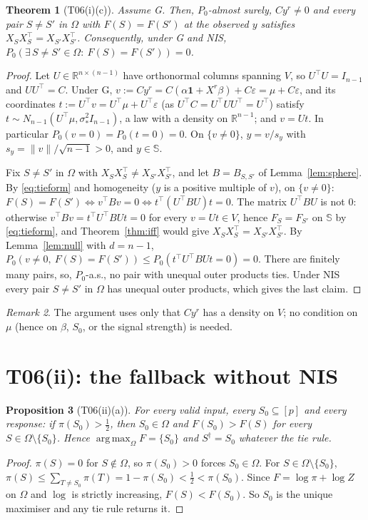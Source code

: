 \documentclass[11pt]{article}
\newtheorem{theorem}{Theorem}[section]
\newtheorem{proposition}[theorem]{Proposition}
\theoremstyle{remark}
\newtheorem{remark}[theorem]{Remark}
\newcommand{\R}{\mathbb R}
\newcommand{\Sph}{\mathbb S}
\newcommand{\one}{\mathbf 1}
\DeclareMathOperator*{\argmax}{arg\,max}
\begin{document}
\begin{theorem}[T06(i)(c)]\label{thm:as}
Assume G. Then, $P_0$-almost surely, $Cy^r\ne0$ and every pair $S\ne S'$ in $\Omega$ with $F(S)=F(S')$ at the observed $y$ satisfies $X_SX_S^\top=X_{S'}X_{S'}^\top$. Consequently, under G and NIS, $P_0(\exists\,S\ne S'\in\Omega:\ F(S)=F(S'))=0$.
\end{theorem}
\begin{proof}
Let $U\in\R^{n\times(n-1)}$ have orthonormal columns spanning $V$, so $U^\top U=I_{n-1}$ and $UU^\top=C$. Under G, $v:=Cy^r=C(\alpha\one+X^r\beta)+C\varepsilon=\mu+C\varepsilon$, and its coordinates $t:=U^\top v=U^\top\mu+U^\top\varepsilon$ (as $U^\top C=U^\top UU^\top=U^\top$) satisfy $t\sim N_{n-1}(U^\top\mu,\sigma_*^2I_{n-1})$, a law with a density on $\R^{n-1}$; and $v=Ut$. In particular $P_0(v=0)=P_0(t=0)=0$. On $\{v\ne0\}$, $y=v/s_y$ with $s_y=\|v\|/\sqrt{n-1}>0$, and $y\in\Sph$.

Fix $S\ne S'$ in $\Omega$ with $X_SX_S^\top\ne X_{S'}X_{S'}^\top$, and let $B=B_{S,S'}$ of Lemma~\ref{lem:sphere}. By \eqref{eq:tieform} and homogeneity ($y$ is a positive multiple of $v$), on $\{v\ne0\}$: $F(S)=F(S')\iff v^\top Bv=0\iff t^\top(U^\top BU)t=0$. The matrix $U^\top BU$ is not $0$: otherwise $v^\top Bv=t^\top U^\top BUt=0$ for every $v=Ut\in V$, hence $F_S=F_{S'}$ on $\Sph$ by \eqref{eq:tieform}, and Theorem~\ref{thm:iff} would give $X_SX_S^\top=X_{S'}X_{S'}^\top$. By Lemma~\ref{lem:null} with $d=n-1$, $P_0(v\ne0,\ F(S)=F(S'))\le P_0(t^\top U^\top BUt=0)=0$. There are finitely many pairs, so, $P_0$-a.s., no pair with unequal outer products ties. Under NIS every pair $S\ne S'$ in $\Omega$ has unequal outer products, which gives the last claim.
\end{proof}

\begin{remark}
The argument uses only that $Cy^r$ has a density on $V$; no condition on $\mu$ (hence on $\beta$, $S_0$, or the signal strength) is needed.
\end{remark}

\section{T06(ii): the fallback without NIS}\label{sec:T06ii}

\begin{proposition}[T06(ii)(a)]\label{prop:strict}
For every valid input, every $S_0\subseteq[p]$ and every response: if $\pi(S_0)>\tfrac12$, then $S_0\in\Omega$ and $F(S_0)>F(S)$ for every $S\in\Omega\setminus\{S_0\}$. Hence $\argmax_\Omega F=\{S_0\}$ and $S^\dagger=S_0$ whatever the tie rule.
\end{proposition}
\begin{proof}
$\pi(S)=0$ for $S\notin\Omega$, so $\pi(S_0)>0$ forces $S_0\in\Omega$. For $S\in\Omega\setminus\{S_0\}$, $\pi(S)\le\sum_{T\ne S_0}\pi(T)=1-\pi(S_0)<\tfrac12<\pi(S_0)$. Since $F=\log\pi+\log Z$ on $\Omega$ and $\log$ is strictly increasing, $F(S)<F(S_0)$. So $S_0$ is the unique maximiser and any tie rule returns it.
\end{proof}
\end{document}
